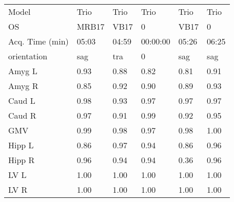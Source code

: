 \begin{table}
\begin{tabular}{llllll}
Model                 &               Trio &               Trio &               Trio &                                               Trio &               Trio \\
OS                    &              MRB17 &               VB17 &                  0 &                                               VB17 &                  0 \\
Acq. Time (min)       &           05:03 &           04:59 &           00:00:00 &                                           05:26 &           06:25 \\
orientation           &                sag &                tra &                  0 &                                                sag &                sag \\
\midrule
Amyg L                &               0.93 &               0.88 &               0.82 &                                               0.81 &               0.91 \\
Amyg R                &               0.85 &               0.92 &               0.90 &                                               0.89 &               0.93 \\
Caud L                &               0.98 &               0.93 &               0.97 &                                               0.97 &               0.97 \\
Caud R                &               0.97 &               0.91 &               0.99 &                                               0.92 &               0.95 \\
GMV                   &               0.99 &               0.98 &               0.97 &                                               0.98 &               1.00 \\
Hipp L                &               0.86 &               0.97 &               0.94 &                                               0.86 &               0.96 \\
Hipp R                &               0.96 &               0.94 &               0.94 &                                               0.36 &               0.96 \\
LV L                  &               1.00 &               1.00 &               1.00 &                                               1.00 &               1.00 \\
LV R                  &               1.00 &               1.00 &               1.00 &                                               1.00 &               1.00 \\

\end{tabular}
\end{table}
